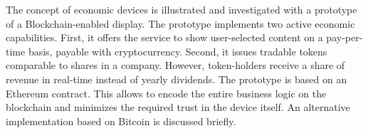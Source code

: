 The concept of economic devices is illustrated and investigated with a prototype of a Blockchain-enabled display. The prototype implements two active economic capabilities. First, it offers the service to show user-selected content on a pay-per-time basis, payable with cryptocurrency. Second, it issues tradable tokens comparable to shares in a company. However, token-holders receive a share of revenue in real-time instead of yearly dividends. The prototype is based on an Ethereum contract. This allows to encode the entire business logic on the blockchain and minimizes the required trust in the device itself. An alternative implementation based on Bitcoin is discussed briefly. 











